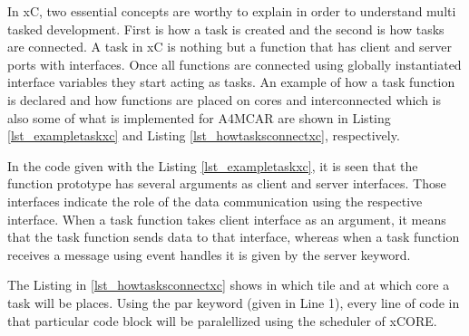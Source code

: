 In xC, two essential concepts are worthy to explain in order to understand multi tasked development. First is how a task is created and the second is how tasks are connected. A task in xC is nothing but a function that has client and server ports with interfaces. Once all functions are connected using globally instantiated interface variables they start acting as tasks. An example of how a task function is declared and how functions are placed on cores and interconnected which is also some of what is implemented for A4MCAR are shown in Listing \ref{lst_exampletaskxc} and Listing \ref{lst_howtasksconnectxc}, respectively.



In the code given with the Listing \ref{lst_exampletaskxc}, it is seen that the function prototype has several arguments as client and server interfaces. Those interfaces indicate the role of the data communication using the respective interface. When a task function takes client interface as an argument, it means that the task function sends data to that interface, whereas when a task function receives a message using event handles it is given by the server keyword.



The Listing in \ref{lst_howtasksconnectxc} shows in which tile and at which core a task will be places. Using the par keyword (given in Line 1), every line of code in that particular code block will be paralellized using the scheduler of xCORE. 

